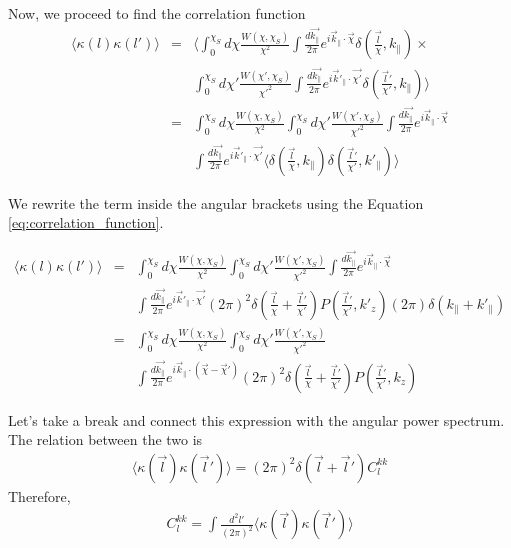 \documentclass[12pt]{article}
\numberwithin{equation}{section}
\begin{document}
Now, we proceed to find the correlation function
\begin{eqnarray}
\langle \kappa(l) \kappa(l') \rangle 
&=& \langle \int_0^{\chi_S} d\chi \frac{W(\chi, \chi_S)}{\chi^2} \int \frac{d\vec{k_\parallel}}{2\pi}   e^{i\vec{k}_\parallel \cdot \vec{\chi}} \delta(\frac{\vec{l}}{\chi}, k_\parallel) \times \nonumber \\
&& \int_0^{\chi_S} d\chi' \frac{W(\chi', \chi_S)}{\chi'^2} \int \frac{d\vec{k_\parallel}}{2\pi}   e^{i\vec{k}'_\parallel \cdot \vec{\chi'}} \delta(\frac{\vec{l}'}{\chi'}, k_\parallel) \rangle
\\
&=&  \int_0^{\chi_S} d\chi \frac{W(\chi, \chi_S)}{\chi^2} \int_0^{\chi_S} d\chi' \frac{W(\chi', \chi_S)}{\chi'^2} \int \frac{d\vec{k_\parallel}}{2\pi}   e^{i\vec{k}_\parallel \cdot \vec{\chi}}
\\  
&&  \int \frac{d\vec{k_\parallel}}{2\pi}e^{i\vec{k}'_\parallel \cdot \vec{\chi'}}  \langle\delta(\frac{\vec{l}}{\chi}, k_\parallel)\delta(\frac{\vec{l}'}{\chi'}, k'_\parallel) \rangle
\end{eqnarray}

We rewrite the term inside the angular brackets using the Equation \ref{eq:correlation_function}. 

\begin{eqnarray}
\langle \kappa(l) \kappa(l') \rangle 
&=&
\int_0^{\chi_S} d\chi \frac{W(\chi, \chi_S)}{\chi^2} \int_0^{\chi_S} d\chi' \frac{W(\chi', \chi_S)}{\chi'^2} \int \frac{d\vec{k_\parallel}}{2\pi}   e^{i\vec{k}_\parallel \cdot \vec{\chi}}
\\  
&&  \int \frac{d\vec{k_\parallel}}{2\pi}e^{i\vec{k}'_\parallel \cdot \vec{\chi'}}  (2\pi)^2 \delta(\frac{\vec{l}}{\chi} + \frac{\vec{l}'}{\chi'}) P(\frac{\vec{l}'}{\chi'}, k'_z) (2\pi) \delta(k_\parallel + k'_\parallel)
\\
&=&
\int_0^{\chi_S} d\chi \frac{W(\chi, \chi_S)}{\chi^2} \int_0^{\chi_S} d\chi' \frac{W(\chi', \chi_S)}{\chi'^2}   
\\  
&& \int \frac{d\vec{k_\parallel}}{2\pi} e^{i\vec{k}_\parallel \cdot (\vec{\chi} - \vec{\chi}')}   (2\pi)^2 \delta(\frac{\vec{l}}{\chi} + \frac{\vec{l}'}{\chi'}) P(\frac{\vec{l}'}{\chi'}, k_z) 
\end{eqnarray}

Let's take a break and connect this expression with the angular power spectrum. The relation between the two is
\begin{eqnarray}
\langle  \kappa (\vec{l}) \kappa(\vec{l}')\rangle = (2\pi)^2 \delta(\vec{l}+\vec{l}') C_l^{kk}
\end{eqnarray}
Therefore,
\begin{eqnarray}
C_l^{kk} = \int \frac{d^2 l'}{(2\pi)^2} \langle  \kappa (\vec{l}) \kappa(\vec{l}')\rangle
\end{eqnarray}
\end{document}
